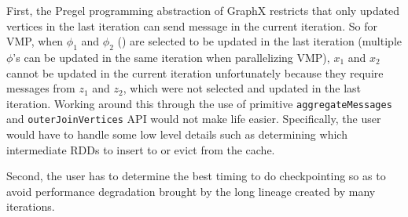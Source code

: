 First, %
the Pregel programming abstraction of GraphX
restricts that only updated vertices in the last iteration can send message in
the current iteration.
So for VMP,  
when $\phi_1$ and $\phi_2$ ()
are selected to be updated
in the last iteration (multiple $\phi$'s can be updated in the same iteration when parallelizing VMP), 
$x_1$ and $x_2$ 
cannot be updated in the current iteration unfortunately 
because they require messages from $z_1$ and $z_2$, which were not selected and updated in the last iteration.
Working around this 
%
through the use of primitive  \texttt{aggregateMessages} and \texttt{outerJoinVertices} API
 would not make life easier.
 Specifically, the user would have to 
 handle some low level details such as determining which intermediate RDDs 
 to insert to or evict from the cache.
 

%
%
%
%


Second, the user has to determine the best timing to do checkpointing so as to
avoid performance degradation brought by the long lineage created by many iterations.


